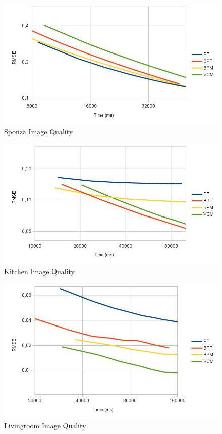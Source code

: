 \begin{figure}[H]
\includegraphics[width=\linewidth]{img/sponzaImgq.jpg}
\caption{\label{img:sponzaImgq} Sponza Image Quality}
\end{figure}

\begin{figure}[H]
\includegraphics[width=\linewidth]{img/kitchenImgq.jpg}
\caption{\label{img:kitchenImgq} Kitchen Image Quality}
\end{figure}

\begin{figure}[H]
\includegraphics[width=\linewidth]{img/livingroomImgq.jpg}
\caption{\label{img:livingroomImgq} Livingroom Image Quality}
\end{figure}

